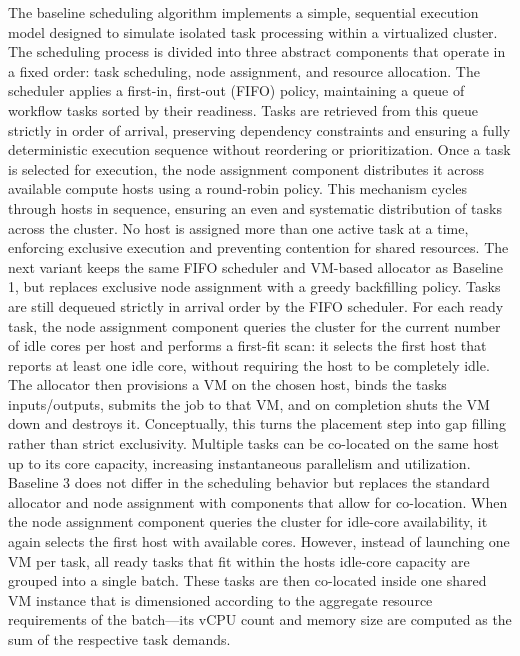 The baseline scheduling algorithm implements a simple, sequential execution model designed to simulate isolated task processing within a virtualized cluster. The scheduling process is divided into three abstract components that operate in a fixed order: task scheduling, node assignment, and resource allocation. The scheduler applies a first-in, first-out (FIFO) policy, maintaining a queue of workflow tasks sorted by their readiness. Tasks are retrieved from this queue strictly in order of arrival, preserving dependency constraints and ensuring a fully deterministic execution sequence without reordering or prioritization.
Once a task is selected for execution, the node assignment component distributes it across available compute hosts using a round-robin policy. This mechanism cycles through hosts in sequence, ensuring an even and systematic distribution of tasks across the cluster. No host is assigned more than one active task at a time, enforcing exclusive execution and preventing contention for shared resources.
The next variant keeps the same FIFO scheduler and VM-based allocator as Baseline 1, but replaces exclusive node assignment with a greedy backfilling policy. Tasks are still dequeued strictly in arrival order by the FIFO scheduler. For each ready task, the node assignment component queries the cluster for the current number of idle cores per host and performs a first-fit scan: it selects the first host that reports at least one idle core, without requiring the host to be completely idle. The allocator then provisions a VM on the chosen host, binds the tasks inputs/outputs, submits the job to that VM, and on completion shuts the VM down and destroys it.
Conceptually, this turns the placement step into gap filling rather than strict exclusivity. Multiple tasks can be co-located on the same host up to its core capacity, increasing instantaneous parallelism and utilization.
Baseline 3 does not differ in the scheduling behavior but replaces the standard allocator and node assignment with components that allow for co-location. When the node assignment component queries the cluster for idle-core availability, it again selects the first host with available cores. However, instead of launching one VM per task, all ready tasks that fit within the hosts idle-core capacity are grouped into a single batch. These tasks are then co-located inside one shared VM instance that is dimensioned according to the aggregate resource requirements of the batch—its vCPU count and memory size are computed as the sum of the respective task demands.
